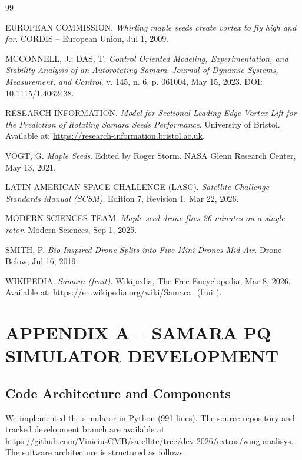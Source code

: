 \documentclass[12pt,a4paper]{article}
\begin{document}
\begin{thebibliography}{99}

EUROPEAN COMMISSION.
\textit{Whirling maple seeds create vortex to fly high and far}.
CORDIS -- European Union, Jul 1, 2009.

MCCONNELL, J.; DAS, T.
\textit{Control Oriented Modeling, Experimentation, and Stability Analysis of an Autorotating Samara}.
\textit{Journal of Dynamic Systems, Measurement, and Control}, v. 145, n. 6, p. 061004, May 15, 2023.
DOI: 10.1115/1.4062438.

RESEARCH INFORMATION.
\textit{Model for Sectional Leading-Edge Vortex Lift for the Prediction of Rotating Samara Seeds Performance}.
University of Bristol.
Available at: \url{https://research-information.bristol.ac.uk}.

VOGT, G.
\textit{Maple Seeds}.
Edited by Roger Storm.
NASA Glenn Research Center, May 13, 2021.

LATIN AMERICAN SPACE CHALLENGE (LASC).
\textit{Satellite Challenge Standards Manual (SCSM)}.
Edition 7, Revision 1, Mar 22, 2026.

MODERN SCIENCES TEAM.
\textit{Maple seed drone flies 26 minutes on a single rotor}.
Modern Sciences, Sep 1, 2025.

SMITH, P.
\textit{Bio-Inspired Drone Splits into Five Mini-Drones Mid-Air}.
Drone Below, Jul 16, 2019.

WIKIPEDIA.
\textit{Samara (fruit)}.
Wikipedia, The Free Encyclopedia, Mar 8, 2026.
Available at: \url{https://en.wikipedia.org/wiki/Samara_(fruit)}.

\end{thebibliography}

\vspace{0.5em}

\section{APPENDIX A -- SAMARA PQ SIMULATOR DEVELOPMENT}
\label{sec:appendix-simulator-development}

\subsection{Code Architecture and Components}

We implemented the simulator in Python (991 lines). The source repository and tracked development branch are available at \url{https://github.com/ViniciusCMB/satellite/tree/dev-2026/extras/wing-analisys}. The software architecture is structured as follows.
\end{document}
